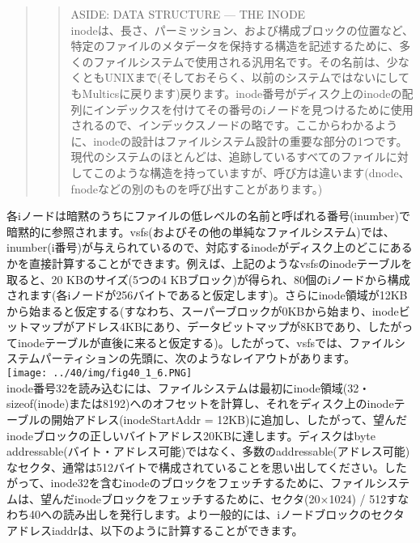 \begin{quote}
\begin{quote}
ASIDE: DATA STRUCTURE --- THE INODE\\
inodeは、長さ、パーミッション、および構成ブロックの位置など、特定のファイルのメタデータを保持する構造を記述するために、多くのファイルシステムで使用される汎用名です。その名前は、少なくともUNIXまで(そしておそらく、以前のシステムではないにしてもMulticsに戻ります)戻ります。inode番号がディスク上のinodeの配列にインデックスを付けてその番号のiノードを見つけるために使用されるので、インデックスノードの略です。ここからわかるように、inodeの設計はファイルシステム設計の重要な部分の1つです。現代のシステムのほとんどは、追跡しているすべてのファイルに対してこのような構造を持っていますが、呼び方は違います(dnode、fnodeなどの別のものを呼び出すことがあります。)
\end{quote}
\end{quote}

各iノードは暗黙のうちにファイルの低レベルの名前と呼ばれる番号(inumber)で暗黙的に参照されます。vsfs(およびその他の単純なファイルシステム)では、inumber(i番号)が与えられているので、対応するinodeがディスク上のどこにあるかを直接計算することができます。例えば、上記のようなvsfsのinodeテーブルを取ると、20
KBのサイズ(5つの4
KBブロック)が得られ、80個のiノードから構成されます(各iノードが256バイトであると仮定します)。さらにinode領域が12KBから始まると仮定する(すなわち、スーパーブロックが0KBから始まり、inodeビットマップがアドレス4KBにあり、データビットマップが8KBであり、したがってinodeテーブルが直後に来ると仮定する)。したがって、vsfsでは、ファイルシステムパーティションの先頭に、次のようなレイアウトがあります。\\
\texttt{[image: ../40/img/fig40\_1\_6.PNG]}\\
inode番号32を読み込むには、ファイルシステムは最初にinode領域(32・sizeof(inode)または8192)へのオフセットを計算し、それをディスク上のinodeテーブルの開始アドレス(inodeStartAddr
=
12KB)に追加し、したがって、望んだinodeブロックの正しいバイトアドレス20KBに達します。ディスクはbyte
addressable(バイト・アドレス可能)ではなく、多数のaddressable(アドレス可能)なセクタ、通常は512バイトで構成されていることを思い出してください。したがって、inode32を含むinodeのブロックをフェッチするために、ファイルシステムは、望んだinodeブロックをフェッチするために、セクタ(20×1024)
/
512すなわち40への読み出しを発行します。より一般的には、iノードブロックのセクタアドレスiaddrは、以下のように計算することができます。

\begin{Shaded}
\begin{Highlighting}[]
\end{Highlighting}
\end{Shaded}

